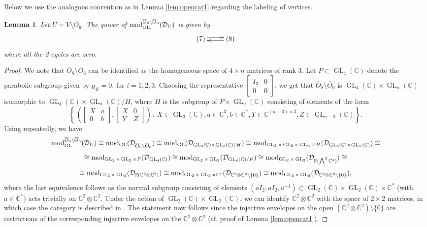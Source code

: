 \documentclass[11pt,reqno]{amsart}
\newcommand{\D}{\mathcal{D}}
\newcommand{\oo}{\otimes}
\newcommand{\tn}{\textnormal}
\newcommand{\C}{\mathbb{C}}
\newcommand{\GL}{\operatorname{GL}}
\newcommand{\ol}[1]{\overline{#1}}
\newtheorem{lemma}[theorem]{Lemma}
\numberwithin{equation}{section}
\begin{document}
Below we use the analogous convention as in Lemma \ref{lem:opencat1}  regarding the labeling of vertices.

\begin{lemma}\label{lem:opencat2}
Let $U=V\setminus \ol{O}_6$. The quiver of $\tn{mod}_{\GL}^{\ol{O}_8 \setminus \ol{O}_6}(\D_{U})$ is given by 
\[\xymatrix{ (7) \ar@<0.5ex>[r]  & (8) \ar@<0.5ex>[l]}\]
where all the 2-cycles are zero.
\end{lemma}

\begin{proof}
We note that $\ol{O}_8\setminus \ol{O}_6$ can be identified as the homogeneous space of $4\times n$ matrices of rank $3$. Let $P \subset \GL_4(\C)$ denote the parabolic subgroup given by $g_{4i} = 0$, for $i=1,2,3$. Choosing the representative $\begin{bmatrix} I_3 & 0 \\ 0 & 0 \end{bmatrix}$, we get that $\ol{O}_8\setminus \ol{O}_6$ is $\GL_4(\C)\times \GL_n(\C)$-isomorphic to $\GL_4(\C)\times \GL_n(\C) / H$, where $H$ is the subgroup of $P \times \GL_n(\C)$  consisting of elements of the form
\[ \left\{ \,\left(\begin{bmatrix} X & a \\ 0 & b \end{bmatrix}, \begin{bmatrix} X & 0 \\ Y & Z \end{bmatrix}\right) \, : \, X\in \GL_3(\C), a\in \C^3, b\in \C^*, Y \in 
\C^{(n-3) \times 3}, Z \in \GL_{n-3}(\C) \right\}. \]
Using \cite[Proposition 4.5]{lHorincz2019categories} repeatedly, we have
\[\tn{mod}_{\GL}^{\ol{O}_8 \setminus \ol{O}_6}(\D_{U})\cong\tn{mod}_{\GL}(\D_{\ol{O}_8\setminus \ol{O}_6}) \cong \tn{mod}_{\GL}(\D_{\GL_4(\C)\times \GL_3(\C) / H}) \cong \tn{mod}_{\GL_2\times \GL_2 \times \GL_n \times H}(\D_{\GL_4(\C)\times \GL_n(\C)}) \cong \]
\[\cong \tn{mod}_{\GL_2\times \GL_2 \times P}(\D_{\GL_4(\C)}) \cong \tn{mod}_{\GL_2\times \GL_2}(\D_{\GL_4(\C)/P}) \cong \tn{mod}_{\GL_2\times \GL_2}(\D_{\mathbb{P}(\bigwedge^3 \C^4)}) \cong\]
\[ \cong \tn{mod}_{\GL_2\times \GL_2}(\D_{\mathbb{P} (\C^2\oo \C^2)})  \cong \tn{mod}_{\GL_2\times \GL_2 \times \C^*}(\D_{\C^2 \otimes \C^2 \setminus \{0\}})  \cong \tn{mod}_{\GL_2\times \GL_2}(\D_{\C^2 \otimes \C^2 \setminus \{0\}}),\]
where the last equivalence follows as the normal subgroup consisting of elements $(a I_2, a I_2, a^{-1}) \subset \GL_2(\C)\times \GL_2(\C) \times \C^*$ (with $a\in \C^*$) acts trivially on $\C^2 \oo \C^2$. Under the action of $\GL_2(\C)\times \GL_2(\C)$, we can identify $\C^2 \otimes \C^2$ with the space of $2\times 2$ matrices, in which case the category is described in \cite[Theorem 5.4]{lHorincz2019categories}. The statement now follows since the injective envelopes on the open $(\C^2 \oo \C^2) \setminus \{0\}$ are restrictions of the corresponding injective envelopes on the $\C^2 \oo \C^2$ (cf. proof of Lemma \ref{lem:opencat1}).
\end{proof} 
\end{document}
